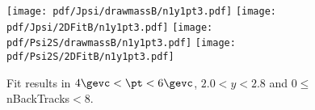 \begin{figure}[H]
\begin{center}
\texttt{[image: pdf/Jpsi/drawmassB/n1y1pt3.pdf]}
\texttt{[image: pdf/Jpsi/2DFitB/n1y1pt3.pdf]}
\vspace*{-0.5cm}
\texttt{[image: pdf/Psi2S/drawmassB/n1y1pt3.pdf]}
\texttt{[image: pdf/Psi2S/2DFitB/n1y1pt3.pdf]}
\vspace*{-0.5cm}
\end{center}
\caption{Fit results in $4\gevc<\pt<6\gevc$, $2.0<y<2.8$ and 0$\leq$nBackTracks$<$8.}
\label{Fitn1y1pt3}
\end{figure}
